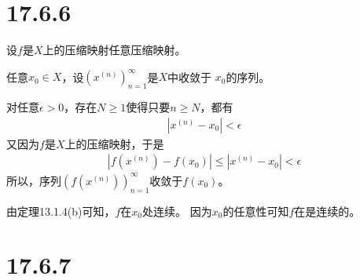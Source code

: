 \documentclass{article}
\begin{document}
\section*{17.6.6}

设$f$是$X$上的压缩映射任意压缩映射。

任意$x_0 \in X$，设$(x^{(n)})_{n = 1}^\infty$是$X$中收敛于
$x_0$的序列。

对任意$\epsilon > 0$，存在$N \geq 1$使得只要$n \geq N$，都有
\begin{align*}
  |x^{(n)} - x_0| < \epsilon
\end{align*}
又因为$f$是$X$上的压缩映射，于是
\begin{align*}
  |f(x^{(n)}) - f(x_0)| \leq |x^{(n)} - x_0| < \epsilon
\end{align*}
所以，序列$(f(x^{(n)}))_{n = 1}^\infty$收敛于$f(x_0)$。

由定理13.1.4(b)可知，$f$在$x_0$处连续。
因为$x_0$的任意性可知$f$在是连续的。

\section*{17.6.7}
\end{document}
